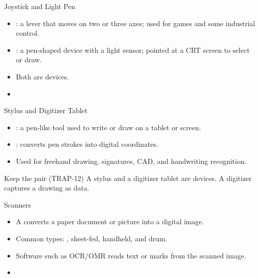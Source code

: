 \documentclass[aspectratio=169]{beamer}
\begin{document}
\begin{frame}{Joystick and Light Pen}
  \begin{itemize}
    \item {}: a lever that moves on two or three axes; used for
      games and some industrial control.
    \item {}: a pen-shaped device with a light sensor; pointed
      at a CRT screen to select or draw.
    \item Both are  devices.
    \item {}
  \end{itemize}
\end{frame}

\begin{frame}{Stylus and Digitizer Tablet}
  \begin{itemize}
    \item {}: a pen-like tool used to write or draw on a tablet or
      screen.
    \item {}: converts pen strokes into
      digital coordinates.
    \item Used for freehand drawing, signatures, CAD, and handwriting
      recognition.
  \end{itemize}
  \begin{block}{Keep the pair (TRAP-12)}
    A stylus and a digitizer tablet are  devices. A digitizer
    captures a drawing as data.
  \end{block}
\end{frame}

\begin{frame}{Scanners}
  \begin{itemize}
    \item A  converts a paper document or picture into a
      digital image.
    \item Common types: , sheet-fed, handheld, and drum.
    \item Software such as OCR/OMR reads text or marks from the scanned
      image.
    \item {}
  \end{itemize}
\end{frame}
\end{document}
